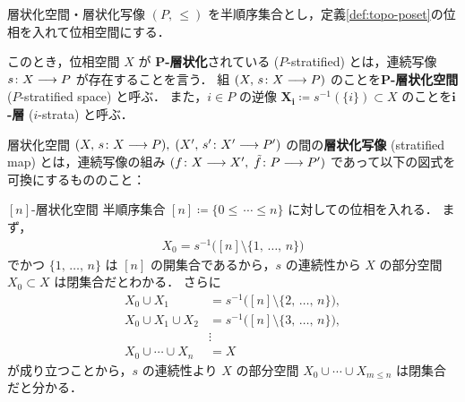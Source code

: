 \documentclass[TQFT_main]{subfiles}
\begin{document}
\begin{mydef}[label=def:stratified-space]{層状化空間・層状化写像}
    $(P,\, \le)$ を半順序集合とし，定義\ref{def:topo-poset}の位相を入れて位相空間にする．
    
    このとき，位相空間 $X$ が $\bm{P}$\textbf{-層状化}されている ($P$-stratified) とは，連続写像 $s \colon X \longrightarrow P$ が存在することを言う．
    組 $(X,\, s \colon X \longrightarrow P)$ のことを\textbf{$\bm{P}$-層状化空間} ($P$-stratified space) と呼ぶ．
    また，$i \in P$ の逆像 $\bm{X_i} \coloneqq s^{-1}(\{i\}) \subset X$ のことを\textbf{$\bm{i}$-層} ($i$-strata) と呼ぶ．

    \tcblower

    層状化空間 $(X,\, s \colon X \longrightarrow P),\; (X',\, s' \colon X' \longrightarrow P')$ の間の\textbf{層状化写像} (stratified map) とは，連続写像の組み $(f \colon X \longrightarrow X',\; \tilde{f} \colon P \longrightarrow P')$ であって以下の図式を可換にするもののこと：
    \begin{center}
    \end{center}
\end{mydef}

\begin{myexample}[label=ex:strat-n]{{$[n]$}-層状化空間}
    半順序集合 $[n] \coloneqq \{0 \le \, \cdots \le n\}$ に対しての位相を入れる．
    まず，
    \begin{align}
        X_0 = s^{-1} \bigl( [n] \setminus \{1,\, \dots,\, n\} \bigr) 
    \end{align}
    でかつ $\{1,\, \dots,\, n\}$ は $[n]$ の開集合であるから，$s$ の連続性から $X$ の部分空間 $X_0 \subset X$ は閉集合だとわかる．
    さらに
    \begin{align}
        X_0 \cup X_1 &= s^{-1} \bigl( [n] \setminus \{2,\, \dots,\, n\} \bigr), \\
        X_0 \cup X_1 \cup X_2 &= s^{-1} \bigl( [n] \setminus \{3,\, \dots,\, n\} \bigr), \\
        &\vdots \\
        X_0 \cup \cdots \cup X_n &= X
    \end{align}
    が成り立つことから，$s$ の連続性より $X$ の部分空間 $X_0 \cup \cdots \cup X_{m \le n}$ は閉集合だと分かる．
\end{myexample}
\end{document}
